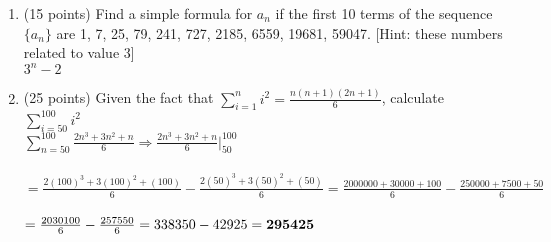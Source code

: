 \documentclass[11pt]{article}
\newcommand\tab[1][1cm]{\hspace*{#1}}
\begin{document}
\begin{enumerate}
\item (15 points) Find a simple formula for $a_n$ if the first 10 terms of the sequence $\{a_n\}$ are 1, 7, 25, 79,
241, 727, 2185, 6559, 19681, 59047. [Hint: these numbers related to value 3] \\
    \tab$3^n-2$


\item (25 points) Given the fact that $\sum_{i=1}^ni^2=\frac{n(n+1)(2n+1)}{6}$, calculate $\sum_{i=50}^{100}i^2$\\
  \tab $\sum_{n=50}^{100}\frac{2n^3+3n^2+n}{6} \Rightarrow \frac{2n^3+3n^2+n}{6}\Big|_{50}^{100}$ \\\\
  \tab$= \frac{2(100)^3+3(100)^2+(100)}{6}-\frac{2(50)^3+3(50)^2+(50)}{6} = \frac{2000000+30000+100}{6}-\frac{250000+7500+50}{6}$ \\\\
  \tab$= \frac{2030100}{6}-\frac{257550}{6} = 338350-42925 = \bf{295425}$

 \end{enumerate}
\end{document}
